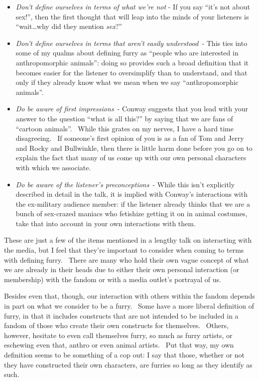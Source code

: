 \begin{itemize}
\tightlist
\item
  \emph{Don't define ourselves in terms of what we're not} - If you say
  ``it's not about sex!'', then the first thought that will leap into
  the minds of your listeners is ``wait\ldots{}why did they mention
  \emph{sex}?''
\item
  \emph{Don't define ourselves in terms that aren't easily understood}~-
  This ties into some of my qualms about defining furry as ``people who
  are interested in anthropomorphic animals'': doing so provides such a
  broad definition that it becomes easier for the listener to
  oversimplify than to understand, and that only if they already know
  what we mean when we say ``anthropomorphic animals''.
\item
  \emph{Do be aware of first impressions}~- Conway suggests that you
  lead with your answer to the question ``what is all this?'' by saying
  that we are fans of ``cartoon animals''. ~While this grates on my
  nerves, I have a hard time disagreeing. ~If someone's first opinion of
  you is as a fan of Tom and Jerry and Rocky and Bullwinkle, then there
  is little harm done before you go on to explain the fact that many of
  us come up with our own personal characters with which we associate.
\item
  \emph{Do be aware of the listener's preconceptions}~- While this isn't
  explicitly described in detail in the talk, it is implied with
  Conway's interactions with the ex-military audience member: if the
  listener already thinks that we are a bunch of sex-crazed maniacs who
  fetishize getting it on in animal costumes, take that into account in
  your own interactions with them.
\end{itemize}

These are just a few of the items mentioned in a lengthy talk on
interacting with the media, but I feel that they're important to
consider when coming to terms with defining furry. ~There are many who
hold their own vague concept of what we are already in their heads due
to either their own personal interaction (or membership) with the fandom
or with a media outlet's portrayal of us.

Besides even that, though, our interaction with others within the fandom
depends in part on what we consider to be a furry. ~Some have a more
liberal definition of furry, in that it includes constructs that are not
intended to be included in a fandom of those who create their own
constructs for themselves. ~Others, however, hesitate to even call
themselves furry, so much as furry artists, or eschewing even that,
anthro or even animal artists. ~Put that way, my own definition seems to
be something of a cop out: I say that those, whether or not they have
constructed their own characters, are furries so long as they identify
as such.

